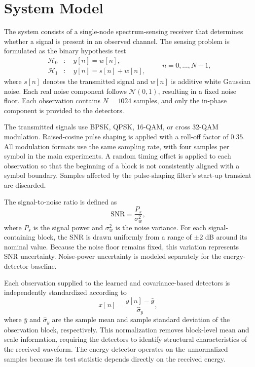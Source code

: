 \documentclass[conference]{IEEEtran}
\begin{document}
\section{System Model}
The system consists of a single-node spectrum-sensing receiver that determines whether a signal is present in an observed channel. The sensing problem is formulated as the binary hypothesis test
\begin{equation}
\begin{aligned}
\mathcal{H}_0 &: \quad y[n] = w[n],\\
\mathcal{H}_1 &: \quad y[n] = s[n] + w[n],
\end{aligned}
\qquad n=0,\ldots,N-1,
\label{eq:hypotheses}
\end{equation}
where $s[n]$ denotes the transmitted signal and $w[n]$ is additive white Gaussian noise. Each real noise component follows $\mathcal{N}(0,1)$, resulting in a fixed noise floor. Each observation contains $N=1024$ samples, and only the in-phase component is provided to the detectors.

The transmitted signals use BPSK, QPSK, 16-QAM, or cross 32-QAM modulation. Raised-cosine pulse shaping is applied with a roll-off factor of $0.35$. All modulation formats use the same sampling rate, with four samples per symbol in the main experiments. A random timing offset is applied to each observation so that the beginning of a block is not consistently aligned with a symbol boundary. Samples affected by the pulse-shaping filter's start-up transient are discarded.

The signal-to-noise ratio is defined as
\begin{equation}
\mathrm{SNR} = \frac{P_s}{\sigma_w^2},
\label{eq:snr}
\end{equation}
where $P_s$ is the signal power and $\sigma_w^2$ is the noise variance. For each signal-containing block, the SNR is drawn uniformly from a range of $\pm 2$ dB around its nominal value. Because the noise floor remains fixed, this variation represents SNR uncertainty. Noise-power uncertainty is modeled separately for the energy-detector baseline.

Each observation supplied to the learned and covariance-based detectors is independently standardized according to
\begin{equation}
x[n] = \frac{y[n]-\bar{y}}{\hat{\sigma}_y},
\label{eq:block_normalization}
\end{equation}
where $\bar{y}$ and $\hat{\sigma}_y$ are the sample mean and sample standard deviation of the observation block, respectively. This normalization removes block-level mean and scale information, requiring the detectors to identify structural characteristics of the received waveform. The energy detector operates on the unnormalized samples because its test statistic depends directly on the received energy.
\end{document}
